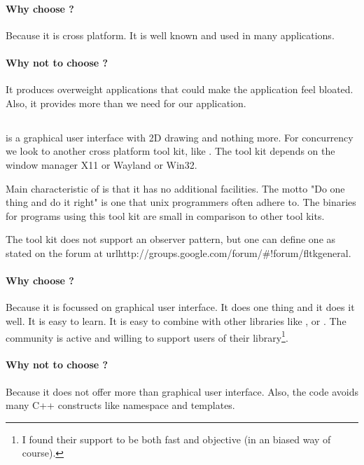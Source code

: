 \paragraph{Why choose ?} Because it is cross platform. It is well
known and used in many applications.
 
\paragraph{Why not to choose ?} It produces overweight applications
that could make the application feel bloated. Also, it provides more than we
need for our application.

\subsection{}

 is a graphical user interface with 2D drawing and nothing more. For
concurrency we look to another cross platform tool kit, like . The
tool kit  depends on the window manager X11 or Wayland or Win32.

Main characteristic of  is that it has no additional facilities.  The
motto "Do one thing and do it right" is one that unix programmers often adhere
to. The binaries for programs using this tool kit are small in comparison to
other tool kits. 

The tool kit  does not support an observer pattern, but one can define
one as stated on the forum at
url{http://groups.google.com/forum/\#!forum/fltkgeneral}.

\paragraph{Why choose ?} Because it is focussed on graphical user
interface.  It does one thing and it does it well. It is easy to learn. It is
easy to combine with other libraries like ,  or .
The community is active and willing to support users of their
library\footnote{I found their support to be both fast and objective (in an
 biased way of course).}. 

\paragraph{Why not to choose ?} Because it does not offer more than
graphical user interface. Also, the code avoids many C++ constructs like
namespace and templates.

